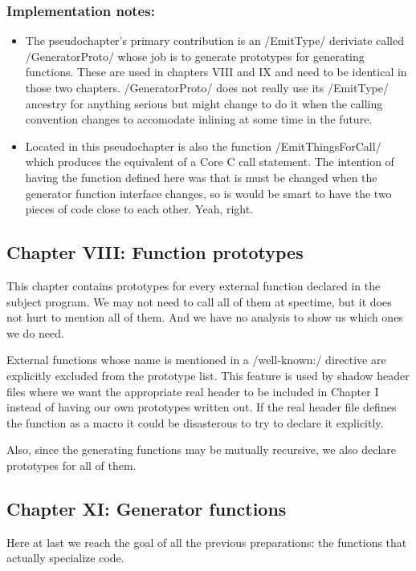\begin{docpart}
\subsubsection{Implementation notes:}
\begin{itemize}
\item The pseudochapter's primary contribution is an /EmitType/
	deriviate called /GeneratorProto/ whose job is to generate
	prototypes for generating functions. These are used in
	chapters VIII and IX and need to be identical in those
	two chapters. /GeneratorProto/ does not really use its
	/EmitType/ ancestry for anything serious but might
	change to do it when the calling convention changes to
	accomodate inlining at some time in the future.
\item Located in this pseudochapter is also the function
	/EmitThingsForCall/ which produces the \Pgen equivalent
	of a Core C call statement. The intention of having the
	function defined here was that is must be changed when
	the generator function interface changes, so is would
	be smart to have the two pieces of code close to each
	other. Yeah, right.
\end{itemize}

\subsection{Chapter VIII: Function prototypes}
This chapter contains prototypes for every external function declared
in the subject program. We may not need to call all of them at
spectime, but it does not hurt to mention all of them. And we have
no analysis to show us which ones we do need.

External functions whose name is mentioned in a /well-known:/
directive are explicitly excluded from the prototype list. This
feature is used by shadow header files where we want the appropriate
real header to be included in Chapter I instead of having our own
prototypes written out. If the real header file defines the function
as a macro it could be disasterous to try to declare it explicitly.

Also, since the generating functions may be mutually recursive, we
also declare prototypes for all of them.

\subsection{Chapter XI: Generator functions}
Here at last we reach the goal of all the previous preparations:
the functions that actually specialize code.


\end{docpart}
